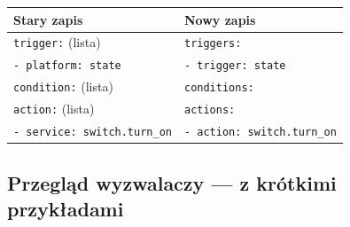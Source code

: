 \documentclass[11pt,a4paper]{article}
\begin{document}
\begin{center}
\begin{tabular}{ll}
\toprule
\textbf{Stary zapis} & \textbf{Nowy zapis}\\
\midrule
\texttt{trigger:} (lista) & \texttt{triggers:}\\
\texttt{- platform: state} & \texttt{- trigger: state}\\
\texttt{condition:} (lista) & \texttt{conditions:}\\
\texttt{action:} (lista) & \texttt{actions:}\\
\texttt{- service: switch.turn\_on} & \texttt{- action: switch.turn\_on}\\
\bottomrule
\end{tabular}
\end{center}

\subsection{Przegląd wyzwalaczy --- z krótkimi przykładami}
\end{document}
